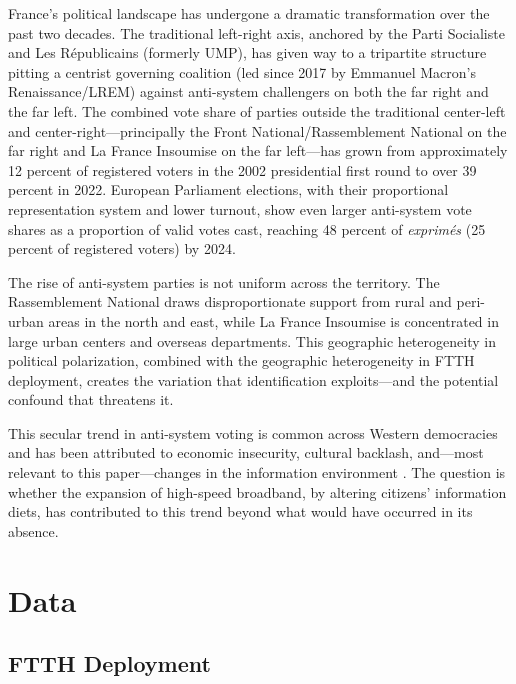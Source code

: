 \documentclass[12pt]{article}
\begin{document}
France's political landscape has undergone a dramatic transformation over the past two decades. The traditional left-right axis, anchored by the Parti Socialiste and Les R\'epublicains (formerly UMP), has given way to a tripartite structure pitting a centrist governing coalition (led since 2017 by Emmanuel Macron's Renaissance/LREM) against anti-system challengers on both the far right and the far left. The combined vote share of parties outside the traditional center-left and center-right---principally the Front National/Rassemblement National on the far right and La France Insoumise on the far left---has grown from approximately 12 percent of registered voters in the 2002 presidential first round to over 39 percent in 2022. European Parliament elections, with their proportional representation system and lower turnout, show even larger anti-system vote shares as a proportion of valid votes cast, reaching 48 percent of \emph{exprim\'es} (25 percent of registered voters) by 2024.

The rise of anti-system parties is not uniform across the territory. The Rassemblement National draws disproportionate support from rural and peri-urban areas in the north and east, while La France Insoumise is concentrated in large urban centers and overseas departments. This geographic heterogeneity in political polarization, combined with the geographic heterogeneity in FTTH deployment, creates the variation that identification exploits---and the potential confound that threatens it.

This secular trend in anti-system voting is common across Western democracies and has been attributed to economic insecurity, cultural backlash, and---most relevant to this paper---changes in the information environment \citep{guriev2021informational}. The question is whether the expansion of high-speed broadband, by altering citizens' information diets, has contributed to this trend beyond what would have occurred in its absence.



\section{Data}\label{sec:data}

\subsection{FTTH Deployment}
\end{document}
